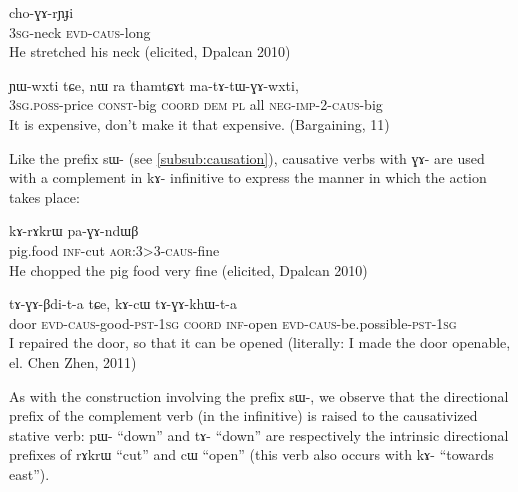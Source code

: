 \documentclass[oldfontcommands,oneside,a4paper,11pt]{memoir}
\newcommand{\ipa}[1]{{\phon #1}} %
\newcommand{\aor}{\textsc{aor}}
\newcommand{\caus}{\textsc{caus}}
\newcommand{\coord}{\textsc{coord}}
\newcommand{\const}{\textsc{const}}
\newcommand{\dem}{\textsc{dem}}
\newcommand{\evd}{\textsc{evd}}
\newcommand{\imp}{\textsc{imp}}
\newcommand{\inftv}{\textsc{inf}}
\newcommand{\negat}{\textsc{neg}}
\newcommand{\pl}{\textsc{pl}}
\newcommand{\poss}{\textsc{poss}}
\newcommand{\pst}{\textsc{pst}}
\newcommand{\sg}{\textsc{sg}}
\begin{document}
\begin{exe}
\ex 
\gll \ipa{ɯ-mke}  	\ipa{cho-ɣɤ-rɲɟi} \\
3\sg{}-neck \evd{}-\caus{}-long \\
 \glt  He stretched his neck (elicited, Dpalcan 2010)
   \end{exe}
 
 \begin{exe}
\ex 
\gll   \ipa{ɯ-phɯ} \ipa{ɲɯ-wxti} \ipa{tɕe}, \ipa{nɯ} \ipa{ra} \ipa{thamtɕɤt} \ipa{ma-tɤ-tɯ-ɣɤ-wxti},\\
 3\sg{}.\poss{}-price \const{}-big \coord{} \dem{} \pl{} all \negat{}-\imp{}-2-\caus{}-big \\
 \glt  It is expensive, don't make it that expensive. (Bargaining, 11) 
   \end{exe}
 
 
Like the prefix \ipa{sɯ-} (see \ref{subsub:causation}), causative verbs with \ipa{ɣɤ-} are used with a complement in \ipa{kɤ-} infinitive to express the manner in which the action takes place:

\begin{exe}
\ex 
\gll \ipa{paʁndza}  	\ipa{kɤ-rɤkrɯ}  	\ipa{pa-ɣɤ-ndɯβ}  \\
pig.food \inftv{}-cut \aor{}:3>3-\caus{}-fine \\
 \glt  He chopped the pig food very fine (elicited, Dpalcan 2010)
   \end{exe}
   
 \begin{exe}
\ex 
\gll \ipa{kɯm}  	\ipa{tɤ-ɣɤ-βdi-t-a}  	\ipa{tɕe,}  	\ipa{kɤ-cɯ}  	\ipa{tɤ-ɣɤ-khɯ-t-a}  	  \\
door \evd{}-\caus{}-good-\pst{}-1\sg{} \coord{} \inftv{}-open \evd{}-\caus{}-be.possible-\pst{}-1\sg{} \\
 \glt   I repaired the door, so that it can be opened (literally: I made the door openable, el. Chen Zhen, 2011)
   \end{exe}

    
As with the construction involving the prefix \ipa{sɯ-}, we observe that the directional prefix of the complement verb (in the infinitive) is raised to the causativized stative verb: \ipa{pɯ-} ``down'' and  \ipa{tɤ-} ``down'' are respectively the intrinsic directional prefixes of \ipa{rɤkrɯ} ``cut'' and  \ipa{cɯ} ``open'' (this verb also occurs with \ipa{kɤ-} ``towards east''). 
 
\end{document}
